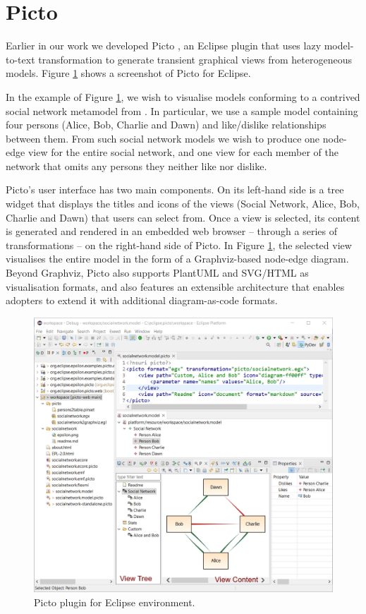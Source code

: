 \documentclass[sigconf,review]{acmart}
\begin{document}
\section{Picto}
\label{sec:picto}

Earlier in our work we developed Picto \cite{dimitris2020picto}, an Eclipse plugin that uses lazy model-to-text transformation to generate transient graphical views from heterogeneous models. Figure \ref{fig:picto-eclipse} shows a screenshot of Picto for Eclipse.

In the example of Figure \ref{fig:picto-eclipse}, we wish to visualise models conforming to a contrived social network metamodel from \cite{dimitris2020picto}. In particular, we use a sample model containing four persons (Alice, Bob,  Charlie and Dawn) and like/dislike relationships between them. From such social network models we wish to produce one node-edge view for the entire social network, and one view for each member of the network that omits any persons they neither like nor dislike. 

Picto’s user interface has two main components. On its left-hand side is a tree widget that displays the titles and icons of the views (Social Network, Alice, Bob, Charlie and Dawn) that users can select from. Once a view is selected, its content is generated and rendered in an embedded web browser -- through a series of transformations -- on the right-hand side of Picto. In Figure \ref{fig:picto-eclipse}, the selected view visualises the entire model in the form of a Graphviz-based node-edge diagram. Beyond Graphviz, Picto also supports PlantUML and SVG/HTML as visualisation formats, and also features an extensible architecture that enables adopters to extend it with additional diagram-as-code formats.  

\begin{figure}[h]
  \centering
  \includegraphics[width=\linewidth]{images/picto-eclipse.png}
  \caption{Picto plugin for Eclipse environment.}
  \label{fig:picto-eclipse}
\end{figure}
\end{document}
